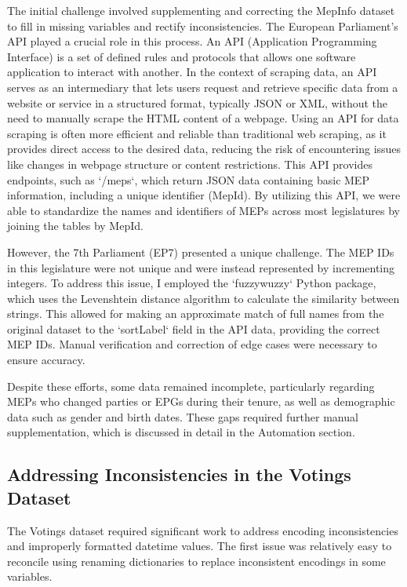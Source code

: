 \documentclass{article}
\begin{document}
The initial challenge involved supplementing and correcting the MepInfo dataset to fill in missing variables and rectify inconsistencies. The European Parliament's API played a crucial role in this process. An API (Application Programming Interface) is a set of defined rules and protocols that allows one software application to interact with another. In the context of scraping data, an API serves as an intermediary that lets users request and retrieve specific data from a website or service in a structured format, typically JSON or XML, without the need to manually scrape the HTML content of a webpage.
Using an API for data scraping is often more efficient and reliable than traditional web scraping, as it provides direct access to the desired data, reducing the risk of encountering issues like changes in webpage structure or content restrictions. This API provides endpoints, such as `/meps`, which return JSON data containing basic MEP information, including a unique identifier (MepId). By utilizing this API, we were able to standardize the names and identifiers of MEPs across most legislatures by joining the tables by MepId.

    However, the 7th Parliament (EP7) presented a unique challenge. The MEP IDs in this legislature were not unique and were instead represented by incrementing integers. To address this issue, I employed the `fuzzywuzzy` Python package, which uses the Levenshtein distance algorithm to calculate the similarity between strings. This allowed for making an approximate match of full names from the original dataset to the `sortLabel` field in the API data, providing the correct MEP IDs. Manual verification and correction of edge cases were necessary to ensure accuracy.

Despite these efforts, some data remained incomplete, particularly regarding MEPs who changed parties or EPGs during their tenure, as well as demographic data such as gender and birth dates. These gaps required further manual supplementation, which is discussed in detail in the Automation section.

\subsection{Addressing Inconsistencies in the Votings Dataset}

The Votings dataset required significant work to address encoding inconsistencies and improperly formatted datetime values. The first issue was relatively easy to reconcile using renaming dictionaries to replace inconsistent encodings in some variables.
\end{document}
